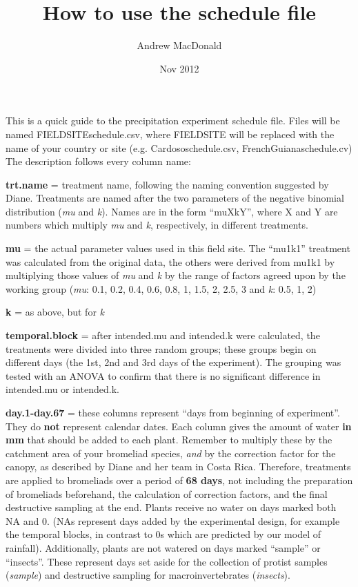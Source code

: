 \documentclass[12pt]{article}
\title{How to use the schedule file}
\author{Andrew MacDonald}
\date{Nov 2012}
\begin{document}
\maketitle


This is a quick guide to the precipitation experiment schedule
file. Files will be named FIELDSITEschedule.csv, where FIELDSITE will
be replaced with the name of your country or site
(e.g. Cardososchedule.csv, FrenchGuianaschedule.cv) The description
follows every column name:


\textbf{trt.name} = treatment name, following the naming convention
suggested by Diane.  Treatments are named after the two parameters of
the negative binomial distribution (\emph{mu} and \emph{k}).
Names are in the form ``muXkY'', where X and Y are numbers which
multiply \emph{mu} and \emph{k}, respectively, in different
treatments.

\textbf{mu} = the actual parameter values used in this field
site. The ``mu1k1'' treatment was calculated from the original data,
the others were derived from mu1k1 by multiplying those values of
\emph{mu} and \emph{k} by the range of factors agreed upon by the
working group (\emph{mu}: 0.1, 0.2, 0.4, 0.6, 0.8, 1, 1.5, 2, 2.5, 3
and \emph{k}: 0.5, 1, 2)

\textbf{k} = as above, but for \emph{k}

\textbf{temporal.block} = after intended.mu and intended.k were
calculated, the treatments were divided into three random groups;
these groups begin on different days (the 1st, 2nd and 3rd days of the
experiment).  The grouping was tested with an ANOVA to confirm that
there is no significant difference in intended.mu or intended.k.

\textbf{day.1-day.67} = these columns represent ``days from beginning of
experiment''. They do \textbf{not} represent calendar dates.  Each
column gives the amount of water \textbf{in mm} that should be added
to each plant.  Remember to multiply these by the catchment area of
your bromeliad species, \emph{and} by the correction factor for the
canopy, as described by Diane and her team in Costa Rica.  Therefore,
treatments are applied to bromeliads over a period of \textbf{68
  days}, not including the preparation of bromeliads beforehand, the
calculation of correction factors, and the final destructive sampling
at the end.  Plants receive no water on days marked both NA and 0.
(NAs represent days added by the experimental design, for example the
temporal blocks, in contrast to 0s which are predicted by our model of
rainfall).  Additionally, plants are not watered on days marked
``sample'' or ``insects''.  These represent days set aside for the
collection of protist samples (\emph{sample}) and destructive sampling for
macroinvertebrates (\emph{insects}).
\end{document}
